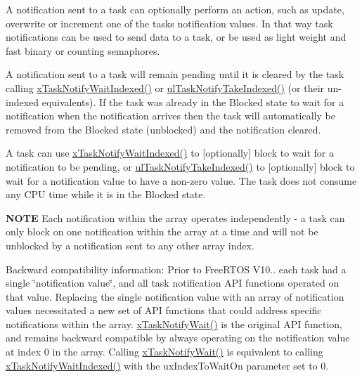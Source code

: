 A notification sent to a task can optionally perform an action, such as update, overwrite or increment one of the task\textquotesingle{}s notification values. In that way task notifications can be used to send data to a task, or be used as light weight and fast binary or counting semaphores.

A notification sent to a task will remain pending until it is cleared by the task calling \hyperlink{externals_2freertos_2include_2task_8h_a5bcd5a5b7d7c41dd782a38093be1b7c9}{x\+Task\+Notify\+Wait\+Indexed()} or \hyperlink{externals_2freertos_2include_2task_8h_a4f42982425f3b106e1a9f19b41ba4124}{ul\+Task\+Notify\+Take\+Indexed()} (or their un-\/indexed equivalents). If the task was already in the Blocked state to wait for a notification when the notification arrives then the task will automatically be removed from the Blocked state (unblocked) and the notification cleared.

A task can use \hyperlink{externals_2freertos_2include_2task_8h_a5bcd5a5b7d7c41dd782a38093be1b7c9}{x\+Task\+Notify\+Wait\+Indexed()} to \mbox{[}optionally\mbox{]} block to wait for a notification to be pending, or \hyperlink{externals_2freertos_2include_2task_8h_a4f42982425f3b106e1a9f19b41ba4124}{ul\+Task\+Notify\+Take\+Indexed()} to \mbox{[}optionally\mbox{]} block to wait for a notification value to have a non-\/zero value. The task does not consume any C\+PU time while it is in the Blocked state.

{\bfseries N\+O\+TE} Each notification within the array operates independently -\/ a task can only block on one notification within the array at a time and will not be unblocked by a notification sent to any other array index.

Backward compatibility information\+: Prior to Free\+R\+T\+OS V10.. each task had a single \char`\"{}notification value\char`\"{}, and all task notification A\+PI functions operated on that value. Replacing the single notification value with an array of notification values necessitated a new set of A\+PI functions that could address specific notifications within the array. \hyperlink{externals_2freertos_2include_2task_8h_a212928744c3d5e0ccc56f1324a3c26f3}{x\+Task\+Notify\+Wait()} is the original A\+PI function, and remains backward compatible by always operating on the notification value at index 0 in the array. Calling \hyperlink{externals_2freertos_2include_2task_8h_a212928744c3d5e0ccc56f1324a3c26f3}{x\+Task\+Notify\+Wait()} is equivalent to calling \hyperlink{externals_2freertos_2include_2task_8h_a5bcd5a5b7d7c41dd782a38093be1b7c9}{x\+Task\+Notify\+Wait\+Indexed()} with the ux\+Index\+To\+Wait\+On parameter set to 0.


